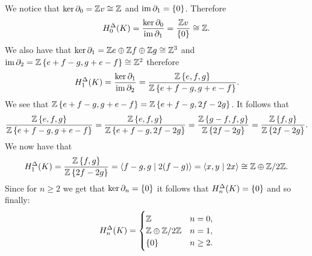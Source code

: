 \documentclass[11pt,a4paper]{article}
\begin{document}
\begin{solution}
  We notice that $\ker \partial_0 = \mathbb{Z} v \cong \mathbb{Z}$
  and $\operatorname{im} \partial_1 = \left\{0\right\}$.
  Therefore
  \[
    H_0^{\Delta}(K) =
    \frac{\ker \partial_0}{\operatorname{im} \partial_1} =
    \frac{\mathbb{Z} v}{\left\{0\right\}} \cong \mathbb{Z}.
  \]
  We also have that $\ker \partial_1 = \mathbb{Z} e \oplus \mathbb{Z} f \oplus \mathbb{Z} g \cong \mathbb{Z}^3$
  and $\operatorname{im} \partial_2 = \mathbb{Z} \left\{e + f - g, g + e - f\right\} \cong \mathbb{Z}^2$ therefore
  \[
    H_1^{\Delta}(K) =
    \frac{\ker \partial_1}{\operatorname{im} \partial_2} =
    \frac{\mathbb{Z} \left\{e,f,g\right\}}{\mathbb{Z} \left\{e + f - g, g + e - f\right\}}.
  \]
  We see that $\mathbb{Z} \left\{e + f - g, g + e - f\right\} = \mathbb{Z}\left\{e + f - g, 2f - 2g\right\}$.
  It follows that
  \[
    \frac{\mathbb{Z} \left\{e,f,g\right\}}{\mathbb{Z} \left\{e + f - g, g + e - f\right\}} =
    \frac{\mathbb{Z} \left\{e,f,g\right\}}{\mathbb{Z} \left\{e + f - g, 2f - 2g\right\}} =
    \frac{\mathbb{Z} \left\{g - f,f,g\right\}}{\mathbb{Z} \left\{2f - 2g\right\}} =
    \frac{\mathbb{Z} \left\{f,g\right\}}{\mathbb{Z} \left\{2f - 2g\right\}}.
  \]
  We now have that
  \[
    H_1^{\Delta}(K) =
    \frac{\mathbb{Z} \left\{f,g\right\}}{\mathbb{Z} \left\{2f - 2g\right\}} =
    \langle f - g, g \mid 2(f - g) \rangle =
    \langle x, y \mid 2x \rangle \cong \mathbb{Z} \oplus \mathbb{Z}/2\mathbb{Z}.
  \]
  Since for $n \geq 2$ we get that $\ker \partial_n = \left\{0\right\}$ it follows
  that $H_n^{\Delta}(K) = \left\{0\right\}$ and so finally:
  \[
    H^{\Delta}_n(K) =
    \begin{cases}
      \mathbb{Z} &n = 0, \\
      \mathbb{Z} \oplus \mathbb{Z}/2\mathbb{Z} &n = 1, \\
      \left\{0\right\} &n \geq 2.
    \end{cases}
  \]
\end{solution}
\end{document}
